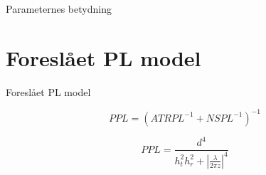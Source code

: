 \begin{frame}{Parameternes betydning}
\begin{table}[H]
\vspace{1em}
\textcolor{black}{
}
\end{table}
\end{frame}

\section{Foreslået PL model}
\begin{frame}{Foreslået PL model}
%
%
\begin{minipage}{0.45\textwidth}
\resizebox{\textwidth}{!}{

}
\end{minipage}%
\hspace{0.05\textwidth}
\begin{minipage}{0.45\textwidth}
\resizebox{\textwidth}{!}{

}
\end{minipage}
\pause
\begin{equation*}
PPL = \left(ATRPL^{-1} + NSPL^{-1}\right)^{-1} \label{proposedModel1}
\end{equation*}

\begin{equation*}
PPL = \frac{d^4}{h_t^2 h_r^2+\left|\frac{\lambda}{2\pi z}\right|^4} \label{proposedModel2}
\end{equation*}

\end{frame}

